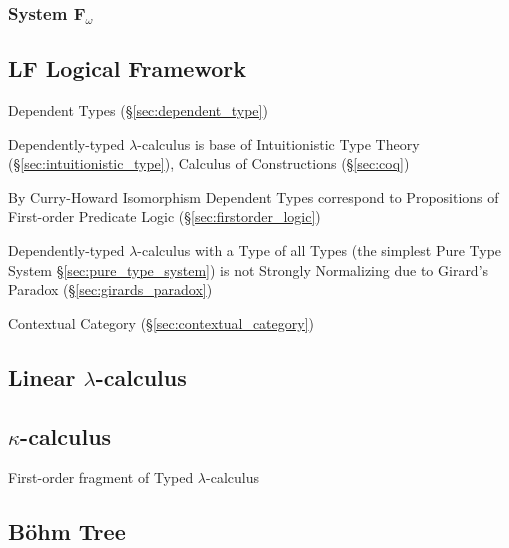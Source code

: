 \subsubsection{System F$_\omega$}\label{sec:system_fomega}



\subsection{LF Logical Framework}
\label{sec:logical_framework}

Dependent Types (\S\ref{sec:dependent_type})

Dependently-typed $\lambda$-calculus is base of Intuitionistic Type
Theory (\S\ref{sec:intuitionistic_type}), Calculus of Constructions
(\S\ref{sec:coq})

By Curry-Howard Isomorphism Dependent Types correspond to Propositions
of First-order Predicate Logic (\S\ref{sec:firstorder_logic})

Dependently-typed $\lambda$-calculus with a Type of all Types (the
simplest Pure Type System \S\ref{sec:pure_type_system}) is not
Strongly Normalizing due to Girard's Paradox
(\S\ref{sec:girards_paradox})

Contextual Category (\S\ref{sec:contextual_category})



\subsection{Linear $\lambda$-calculus}\label{sec:linear_lambda}

\subsection{$\kappa$-calculus}\label{sec:kappa_calculus}

First-order fragment of Typed $\lambda$-calculus



\subsection{B\"ohm Tree}\label{sec:bohm_tree}

